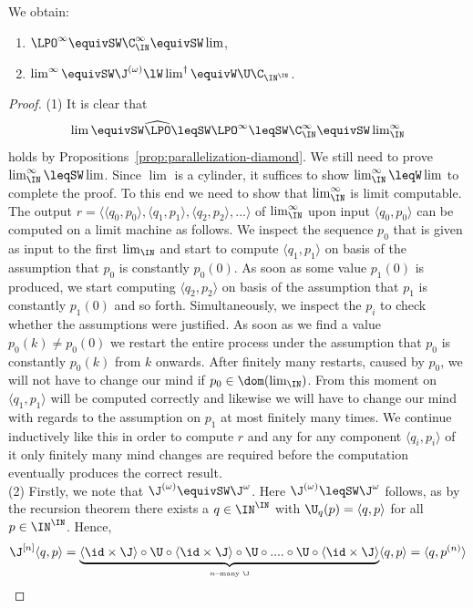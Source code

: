 \begin{prop}
\label{prop:LPO-lim}
We obtain:
\begin{enumerate}
\item $\LPO^\infty\equivSW\C_\IN^\infty\equivSW\lim$,
\item $\lim^\infty\equivSW\J^{(\omega)}\lW\lim^\dagger\equivW\U\C_{\IN^\IN}$.
\end{enumerate}
\end{prop}
\begin{proof}
(1) It is clear that 
\[\lim\equivSW\widehat{\LPO}\leqSW\LPO^\infty\leqSW\C_\IN^\infty\equivSW\lim\nolimits_\IN^\infty\]
holds by
Propositions~\ref{prop:parallelization-diamond}. We still need to prove $\lim_\IN^\infty\leqSW\lim$.
Since $\lim$ is a cylinder, it suffices to show $\lim_\IN^\infty\leqW\lim$ to complete the proof.
To this end we need to show that $\lim_\IN^\infty$ is limit computable.
The output $r=\langle \langle q_0,p_0\rangle,\langle q_1, p_1\rangle,\langle q_2, p_2\rangle,...\rangle$ of 
$\lim_\IN^\infty$ upon input $\langle q_0,p_0\rangle$ can be
computed on a limit machine as follows. We inspect the sequence $p_0$  
that is given as input to the first $\lim_\IN$
and start to compute $\langle q_1,p_1\rangle$ on basis of the assumption that $p_0$ is constantly $p_0(0)$.
As soon as some value $p_1(0)$ is produced, we start computing $\langle q_2,p_2\rangle$ on basis of
the assumption that $p_1$ is constantly $p_1(0)$ and so forth. Simultaneously, we inspect the $p_i$
to check whether the assumptions were justified. As soon as we find a value $p_0(k)\not=p_0(0)$
we restart the entire process under the assumption that $p_0$ is constantly $p_0(k)$ from $k$ onwards.
After finitely many restarts, caused by $p_0$, we will not have to change our mind if $p_0\in\dom(\lim_\IN)$.
From this moment on $\langle q_1,p_1\rangle$ will be computed correctly and likewise we will have
to change our mind with regards to the assumption on $p_1$ at most finitely many times. 
We continue inductively like this in order to compute $r$ and any for any component $\langle q_i,p_i\rangle$
of it only finitely many mind changes are required before the computation eventually produces the correct result.\\
(2) Firstly, we note that $\J^{(\omega)}\equivSW\J^\omega$. Here $\J^{(\omega)}\leqSW\J^\omega$ follows,
as by the recursion theorem there exists a $q\in\IN^\IN$ with $\U_q(p)=\langle q,p\rangle$ for all $p\in\IN^\IN$.
Hence,
\[\J^{[n]}\langle q,p\rangle=\underbrace{\langle\id\times \J\rangle\circ\U\circ\langle \id\times \J\rangle\circ \U\circ....\circ\U\circ\langle\id\times\J\rangle}_{\mbox{\tiny $n$--many $\J$}}\langle q,p\rangle=\langle q,p^{(n)}\rangle\]

\end{proof}
